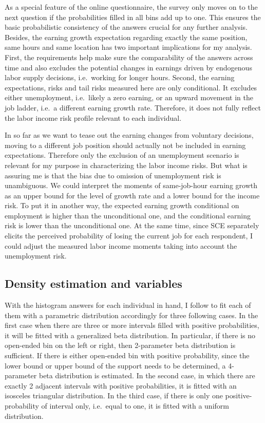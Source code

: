 \documentclass[12pt,notitlepage,onecolumn,aps,pra]{article}
\begin{document}
As a special feature of the online questionnaire, the survey only moves
on to the next question if the probabilities filled in all bins add up
to one. This ensures the basic probabilistic consistency of the answers
crucial for any further analysis. Besides, the earning growth
expectation regarding exactly the same position, same hours and same
location has two important implications for my analysis. First, the
requirements help make sure the comparability of the answers across time
and also excludes the potential changes in earnings driven by endogenous
labor supply decisions, i.e.~working for longer hours. Second, the
earning expectations, risks and tail risks measured here are only
conditional. It excludes either unemployment, i.e.~likely a zero
earning, or an upward movement in the job ladder, i.e.~a different
earning growth rate. Therefore, it does not fully reflect the labor
income risk profile relevant to each individual.

In so far as we want to tease out the earning changes from voluntary
decisions, moving to a different job position should actually not be
included in earning expectations. Therefore only the exclusion of an
unemployment scenario is relevant for my purpose in characterizing the
labor income risks. But what is assuring me is that the bias due to
omission of unemployment risk is unambiguous. We could interpret the
moments of same-job-hour earning growth as an upper bound for the level
of growth rate and a lower bound for the income risk. To put it in
another way, the expected earning growth conditional on employment is
higher than the unconditional one, and the conditional earning risk is
lower than the unconditional one. At the same time, since SCE separately
elicits the perceived probability of losing the current job for each
respondent, I could adjust the measured labor income moments taking into
account the unemployment risk.

\hypertarget{density-estimation-and-variables}{%
\subsection{Density estimation and
variables}\label{density-estimation-and-variables}}

With the histogram answers for each individual in hand, I follow
\cite{engelberg_comparing_2009} to fit each of them with a parametric
distribution accordingly for three following cases. In the first case
when there are three or more intervals filled with positive
probabilities, it will be fitted with a generalized beta distribution.
In particular, if there is no open-ended bin on the left or right, then
2-parameter beta distribution is sufficient. If there is either
open-ended bin with positive probability, since the lower bound or upper
bound of the support needs to be determined, a 4-parameter beta
distribution is estimated. In the second case, in which there are
exactly 2 adjacent intervals with positive probabilities, it is fitted
with an isosceles triangular distribution. In the third case, if there
is only one positive-probability of interval only, i.e.~equal to one, it
is fitted with a uniform distribution.
\end{document}
